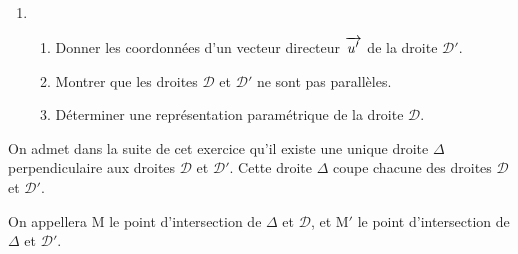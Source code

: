 \documentclass[10pt,a4paper]{article}
\newcommand{\vect}[1]{\overrightarrow{\,\mathstrut#1\,}}
\begin{document}
\medskip

\begin{enumerate}
\item 

	\begin{enumerate}
		\item Donner les coordonnées d'un vecteur directeur $\vect{u'}$ de la droite $\mathcal{D}'$.
		\item Montrer que les droites $\mathcal{D}$ et $\mathcal{D}'$ ne sont pas parallèles.
		\item Déterminer une représentation paramétrique de la droite $\mathcal{D}$.
	\end{enumerate}
\end{enumerate}

On admet dans la suite de cet exercice qu'il existe une unique droite $\Delta$ perpendiculaire aux droites $\mathcal{D}$ et $\mathcal{D}'$. Cette droite $\Delta$ coupe chacune des droites $\mathcal{D}$ et $\mathcal{D}'$. 

On appellera M le point d'intersection de $\Delta$ et $\mathcal{D}$, et M$'$ le point d'intersection de $\Delta$ et $\mathcal{D}'$.
\end{document}
